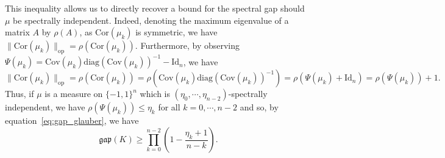 This inequality allows us to directly recover a bound for the spectral gap should \(\mu\) be spectrally 
independent. Indeed, denoting the maximum eigenvalue of a matrix \(A\) by \(\rho(A)\), as \(\text{Cor}(\mu_k)\) is symmetric, we 
have \(\|\text{Cor}(\mu_k)\|_{\text{op}} = \rho(\text{Cor}(\mu_k))\). Furthermore, by observing 
\(\Psi(\mu_k) = \text{Cov}(\mu_k) \text{diag}(\text{Cov}(\mu_k))^{-1} - \text{Id}_n\), we have 
\[\|\text{Cor}(\mu_k)\|_{\text{op}} = \rho(\text{Cor}(\mu_k)) = \rho(\text{Cov}(\mu_k) \text{diag}(\text{Cov}(\mu_k))^{-1})
  = \rho(\Psi(\mu_k) + \text{Id}_n) = \rho(\Psi(\mu_k)) + 1.\]
Thus, if \(\mu\) is a measure on \(\{-1, 1\}^n\) which is \((\eta_0, \cdots, \eta_{n - 2})\)-spectrally 
independent, we have \(\rho(\Psi(\mu_k)) \le \eta_k\) for all \(k = 0, \cdots, n - 2\) and so, by 
equation~\eqref{eq:gap_glauber}, we have
\begin{equation}\label{eq:gap_glauber_final}
  \mathfrak{gap}(K) \ge \prod_{k = 0}^{n - 2}\left(1 - \frac{\eta_k + 1}{n - k}\right).
\end{equation}